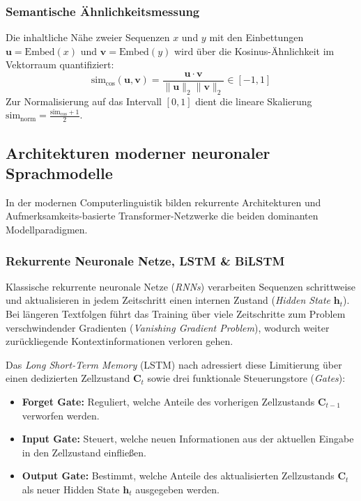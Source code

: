 \subsubsection{Semantische Ähnlichkeitsmessung}
Die inhaltliche Nähe zweier Sequenzen $x$ und $y$ mit den Einbettungen $\mathbf{u} = \text{Embed}(x)$ und $\mathbf{v} = \text{Embed}(y)$ wird über die Kosinus-Ähnlichkeit im Vektorraum quantifiziert:
\begin{equation}
    \text{sim}_{\cos}(\mathbf{u}, \mathbf{v}) = \frac{\mathbf{u} \cdot \mathbf{v}}{\|\mathbf{u}\|_2 \|\mathbf{v}\|_2} \in [-1, 1]
\end{equation}
Zur Normalisierung auf das Intervall $[0, 1]$ dient die lineare Skalierung $\text{sim}_{\text{norm}} = \frac{\text{sim}_{\cos} + 1}{2}$.

\subsection{Architekturen moderner neuronaler Sprachmodelle}
\label{sec:architekturen_sprachmodelle}

In der modernen Computerlinguistik bilden rekurrente Architekturen und Aufmerksamkeits-basierte Transformer-Netzwerke die beiden dominanten Modellparadigmen.

\subsubsection{Rekurrente Neuronale Netze, LSTM \& BiLSTM}
Klassische rekurrente neuronale Netze (\textit{RNNs}) verarbeiten Sequenzen schrittweise und aktualisieren in jedem Zeitschritt einen internen Zustand (\textit{Hidden State} $\mathbf{h}_t$). Bei längeren Textfolgen führt das Training über viele Zeitschritte zum Problem verschwindender Gradienten (\textit{Vanishing Gradient Problem}), wodurch weiter zurückliegende Kontextinformationen verloren gehen.

Das \textit{Long Short-Term Memory} (LSTM) nach \citet{hochreiter1997long} adressiert diese Limitierung über einen dedizierten Zellzustand $\mathbf{C}_t$ sowie drei funktionale Steuerungstore (\textit{Gates}):
\begin{itemize}
    \item \textbf{Forget Gate:} Reguliert, welche Anteile des vorherigen Zellzustands $\mathbf{C}_{t-1}$ verworfen werden.
    \item \textbf{Input Gate:} Steuert, welche neuen Informationen aus der aktuellen Eingabe in den Zellzustand einfließen.
    \item \textbf{Output Gate:} Bestimmt, welche Anteile des aktualisierten Zellzustands $\mathbf{C}_t$ als neuer Hidden State $\mathbf{h}_t$ ausgegeben werden.
\end{itemize}


